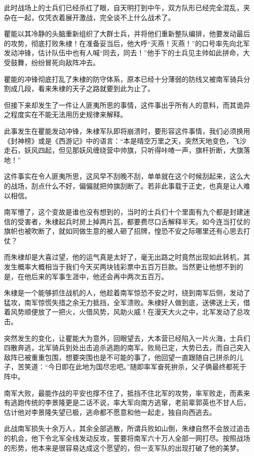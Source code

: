 \begin{multicols}{\theparacolNo}
		此时战场上的士兵们已经杀红了眼，自天明打到中午，双方队形已经完全混乱，夹杂在一起，仅凭衣着展开激战，完全谈不上什么战术了。

		瞿能以其冷静的头脑重新组织了大群士兵，并将他们重新整队编排，他要发动最后的攻势，彻底打败朱棣！在准备妥当后，他大呼“灭燕！灭燕！”的口号率先向北军发动冲锋，估计队伍中也有人喊“同去，同去！”他手下的士兵见主帅如此拼命，大受鼓舞，纷纷冒死向敌阵冲去。

		瞿能的冲锋彻底打乱了朱棣的防守体系，原本已经十分薄弱的防线又被南军骑兵分割成几段，看来朱棣的天子之路就要到此为止了。

		但接下来却发生了一件让人匪夷所思的事情，这件事出乎所有人的意料，而其诡异之程度实在不能无法用历史规律来解释。

		此事发生在瞿能发动冲锋，朱棣军队即将崩溃时，要形容这件事情，我们必须换用《封神榜》或是《西游记》中的语言：“本是晴空万里之天，突然天地变色，飞沙走石，妖风四起，但见那妖风缠绕营中帅旗，只听得咔喳一声，旗杆折断，大旗落地！”

		这件事实在令人匪夷所思，这风早不刮晚不刮，单单就在这个时候刮起来，这么大的战场，刮点什么不好，偏偏就把帅旗刮断了。若非此事载于正史，也真是让人难以相信。

		南军懵了，这个变故是谁也没有想到的，当时的士兵们十个里面有九个都是封建迷信的受害者，朱棣起兵时房上掉两片瓦，都要费尽口舌解释半天。如今连当打仗的旗帜也被吹断了，就如同做生意的被人砸了招牌，惶恐不安之际哪里还有心思去打仗？

		而朱棣却是大喜过望，他的运气真是太好了，毫无出路之时竟然出现如此转机，其发生概率大概相当于我们今天买两块钱彩票中五百万巨款。当然更让他想不到的是，在他后来的军事生涯中，他还会再中两次五百万。

		朱棣是一个能够抓住战机的人，他趁着南军惊恐不安之时，绕到南军后侧，发动了猛攻，南军惊慌失措之余无力抵挡，全军溃败。朱棣好人做到底，送佛送上天，借着风势顺便放了一把火，火借风势，风助火威！在漫天大火之中，北军发动了总攻击。

		突然发生的变化，让瞿能大为意外，回眼望去，大本营已经陷入一片火海，士兵们四散奔逃，北军骑兵到处出击追杀逃跑的南军。败局已定，大势已去，而自己突入敌阵已被重重包围，想要突围也是不可能的事了，他回望一直跟随自己拼杀的儿子，苦笑道：“今日即在此地为国尽忠吧。”随即率军奋死拚杀，父子俩最终都死于阵中。

		南军大败，最能作战的平安也撑不住了，抵挡不住北军的攻势，率军败走，而素来有逃跑传统的李景隆更是二话不说，率大军向南方逃窜，老前辈郭英也不甘人后，估计他对李景隆失望已极，逃命都不愿意和他一起走，独自向西逃去。

		此战南军损失十余万人，其余全部逃散，所谓兵败如山倒，朱棣自然不会放过追击的机会，他下令北军全线发动反攻，誓要将南军六十万人全部一网打尽。按照战场的形势，他本来是很容易达成这个愿望的，但一支军队的出现打破了他的美梦。


\end{multicols}
